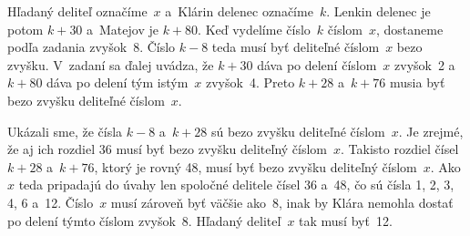 {%
Hľadaný deliteľ označíme~$x$ a~Klárin delenec označíme~$k$. Lenkin delenec je
potom $k + 30$ a~Matejov je $k + 80$. Keď vydelíme číslo~$k$ číslom~$x$, dostaneme
podľa zadania zvyšok~8. Číslo $k-8$ teda musí byť deliteľné číslom~$x$ bezo
zvyšku. V~zadaní sa ďalej uvádza, že $k + 30$ dáva po delení číslom~$x$ zvyšok~2
a~$k + 80$ dáva po delení tým istým~$x$ zvyšok~4. Preto $k + 28$ a~$k + 76$ musia byť bezo
zvyšku deliteľné číslom~$x$.

Ukázali sme, že čísla $k-8$ a~$k + 28$ sú bezo zvyšku deliteľné číslom~$x$.
Je zrejmé, že aj ich rozdiel 36 musí byť bezo zvyšku deliteľný číslom~$x$.
Takisto rozdiel čísel ${k+28}$ a~${k+76}$, ktorý je rovný 48, musí byť bezo
zvyšku deliteľný číslom~$x$. Ako $x$ teda pripadajú do úvahy len spoločné delitele
čísel 36 a~48, čo sú čísla 1, 2, 3, 4, 6 a~12. Číslo~$x$ musí
zároveň byť väčšie ako~8, inak by Klára nemohla dostať po delení týmto
číslom zvyšok~8. Hľadaný deliteľ~$x$ tak musí byť~12.
}

